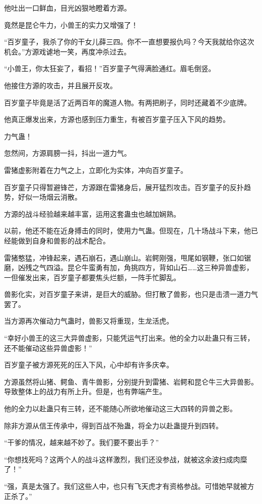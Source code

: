 \begin{this_body}
他吐出一口鲜血，目光凶狠地瞪着方源。

竟然是昆仑牛力，小兽王的实力又增强了！

“百岁童子，我杀了你的干女儿薛三四。你不一直想要报仇吗？今天我就给你这次机会。”方源戏谑地一笑，再度冲杀过去。

“小兽王，你太狂妄了，看招！”百岁童子气得满脸通红。眉毛倒竖。

他接住方源的攻击，并且展开反攻。

百岁童子毕竟是活了近两百年的魔道人物。有两把刷子，同时还藏着不少底牌。

他真正爆发出来，方源也感到压力重生，有被百岁童子压入下风的趋势。

力气蛊！

忽然间，方源肩膀一抖，抖出一道力气。

雷猪虚影附着在力气之上，立即化为实体，冲向百岁童子。

百岁童子只得暂避锋芒，方源跟在雷猪身后，展开猛烈攻击。百岁童子的反扑趋势，好似一场烟云消散。

方源的战斗经验越来越丰富，运用这套蛊虫也越加娴熟。

以前，他还不能在近身搏击的同时，使用力气蛊。但现在，几十场战斗下来，他已经能做到自身和兽影的战术配合。

雷猪憨猛，冲锋起来，遇石崩石，遇山崩山。岩鳄刚强，甩尾如钢鞭，张口如锯磨，凶残之气四溢。昆仑牛蛮勇有加，角挑四方，背如山石……这三种异兽虚影，一但催发出来，百岁童子都要焦头烂额，一阵手忙脚乱。

兽影化实，对百岁童子来讲，是巨大的威胁。但打散了兽影，也只是击溃一道力气罢了。

当方源再次催动力气蛊时，兽影又将重现，生龙活虎。

“幸好小兽王的这三大异兽虚影，只能凭运气打出来。他的全力以赴蛊只有三转，还不能催动这些异兽虚影！”

百岁童子被方源死死的压入下风，心中却有许多庆幸。

方源虽然将山猪、鳄鱼、青牛兽影，分别提升到雷猪、岩鳄和昆仑牛三大异兽影。导致整体上的战力有所上升。但是，也有弊端产生。

他的全力以赴蛊只有三转，还不能随心所欲地催动这三大四转的异兽之影。

除非方源从信王传承中，得到百战不殆蛊，将全力以赴蛊提升到四转。

“干爹的情况，越来越不妙了。我们要不要出手？”

“你想找死吗？这两个人的战斗这样激烈，我们还没参战，就被这余波扫成肉糜了！”

“强，真是太强了。我们这些人中，也只有飞天虎才有资格参战。可惜她早就被方正杀了。”


\end{this_body}
